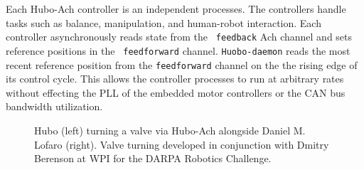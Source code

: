 Each Hubo-Ach controller is an independent processes.  The controllers
handle tasks such as balance, manipulation, and human-robot
interaction.  Each controller asynchronously reads state from the {\tt
  feedback} Ach channel and sets reference positions in the {\tt
  feedforward} channel.  {\tt Huobo-daemon} reads the most recent
reference position from the {\tt feedforward} channel on the the
rising edge of its control cycle.  This allows the controller
processes to run at arbitrary rates without effecting the PLL of the
embedded motor controllers or the CAN bus bandwidth utilization.


\begin{figure}[thpb]
  \centering
\caption{Hubo (left) turning a valve via Hubo-Ach alongside Daniel
  M. Lofaro (right).  Valve turning developed in conjunction with
  Dmitry Berenson at WPI for the DARPA Robotics Challenge.}
  \label{fig:valve}
\end{figure}

